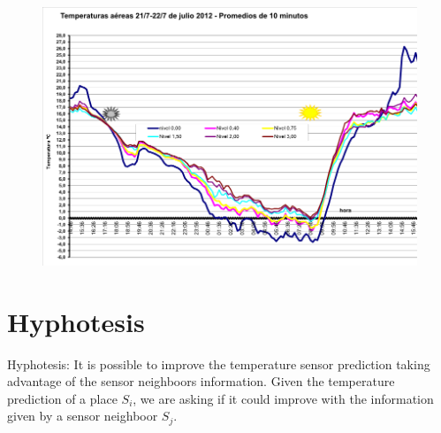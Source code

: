 \documentclass[final,a4paper]{llncs}
\begin{document}
\begin{figure}[h]
\includegraphics[width=0.99\columnwidth]{grafico.png}
\end{figure}\label{fig:T3-result}

\section{Hyphotesis}

%
%
%

Hyphotesis: It is possible to improve the temperature sensor 
prediction taking advantage of the sensor neighboors
information. Given the temperature prediction of a 
place $S_i$, we are asking if it could improve with the information given by a sensor
neighboor $S_j$.
\end{document}
